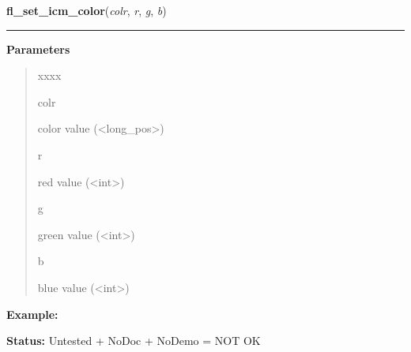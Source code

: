 \hspace{.8\funcindent}\begin{boxedminipage}{\funcwidth}

    \raggedright \textbf{fl\_set\_icm\_color}(\textit{colr}, \textit{r}, \textit{g}, \textit{b})

    \vspace{-1.5ex}

    \rule{\textwidth}{0.5\fboxrule}
\setlength{\parskip}{2ex}
\setlength{\parskip}{1ex}
      \textbf{Parameters}
      \vspace{-1ex}

      \begin{quote}
        \begin{Ventry}{xxxx}

          \item[colr]

          color value ({\textless}long\_pos{\textgreater})

          \item[r]

          red value ({\textless}int{\textgreater})

          \item[g]

          green value ({\textless}int{\textgreater})

          \item[b]

          blue value ({\textless}int{\textgreater})

        \end{Ventry}

      \end{quote}

\textbf{Example:} 

\textbf{Status:} Untested + NoDoc + NoDemo = NOT OK



    \end{boxedminipage}

    \label{xformslib:library:fl_color}

    \vspace{0.5ex}

